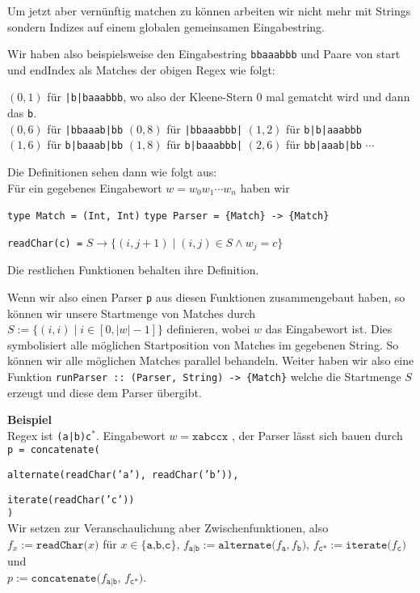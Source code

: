 \documentclass[a4paper,graphics,11pt]{article}
\begin{document}
Um jetzt aber vernünftig matchen zu können arbeiten wir nicht mehr mit Strings sondern Indizes auf einem globalen gemeinsamen
Eingabestring.

Wir haben also beispielsweise den Eingabestring \texttt{bbaaabbb} und Paare von start und endIndex als Matches der obigen Regex
wie folgt:

$(0,1)$ für \texttt{|b|baaabbb}, wo also der Kleene-Stern 0 mal gematcht wird und dann das \texttt{b}.\\
$(0,6)$ für \texttt{|bbaaab|bb}\qquad\qquad
$(0,8)$ für \texttt{|bbaaabbb|}\qquad\qquad
$(1,2)$ für \texttt{b|b|aaabbb}\\
$(1,6)$ für \texttt{b|baaab|bb}\qquad\qquad
$(1,8)$ für \texttt{b|baaabbb|}\qquad\qquad
$(2,6)$ für \texttt{bb|aaab|bb} $\cdots$

Die Definitionen sehen dann wie folgt aus:\\
Für ein gegebenes Eingabewort $w = w_0w_1\cdots w_n$ haben wir

\texttt{type Match = (Int, Int)}\qquad\qquad
\texttt{type Parser = \{Match\} -> \{Match\}}

\texttt{readChar(c) =} $S \to \{(i, j+1) \mid (i,j) \in S \land w_j = c\}$

Die restlichen Funktionen behalten ihre Definition.

Wenn wir also einen Parser \texttt{p} aus diesen Funktionen zusammengebaut haben, so können wir unsere
Startmenge von Matches durch
$
    S := \{(i,i) \mid i \in [0, |w|-1]\}
$
definieren,
wobei $w$ das Eingabewort ist.
Dies symbolisiert alle möglichen Startposition von Matches im gegebenen String.
So können wir alle möglichen Matches parallel behandeln.
Weiter haben wir also eine Funktion \texttt{runParser :: (Parser, String) -> \{Match\}} welche die Startmenge
$S$ erzeugt und diese dem Parser übergibt.

\textbf{Beispiel}\\
Regex ist \texttt{(a|b)c$^\texttt{*}$}. Eingabewort $w = \texttt{xabccx}$ , der Parser lässt sich bauen durch\\
\texttt{p = concatenate(}\\
\strut\qquad\texttt{alternate(readChar('a'), readChar('b')),}\\
\strut\qquad\texttt{iterate(readChar('c'))}\\
\texttt{)}\\
Wir setzen zur Veranschaulichung aber Zwischenfunktionen, also\\
$f_x := \texttt{readChar($x$)}$ für $x \in \{\texttt{a,b,c}\}$,
$f_\texttt{a|b} := \texttt{alternate($f_\texttt{a}, f_\texttt{b}$)}$,
$f_\texttt{c*} := \texttt{iterate($f_\texttt{c}$)}$ und\\
$p := \texttt{concatenate($f_\texttt{a|b}$, $f_\texttt{c*}$)}$.
\end{document}
